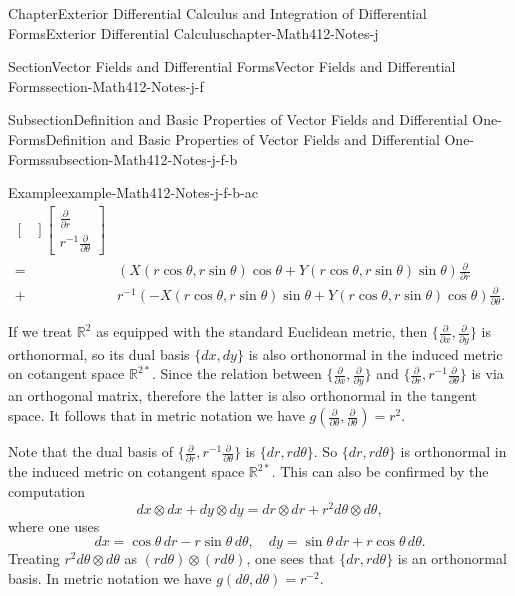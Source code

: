 \documentclass[oneside,10pt,]{book}
\numberwithin{equation}{section}
\newcommand{\bbR}{\mathbb{R}}
\newcommand{\amp}{&}
\begin{document}
\begin{chapterptx}{Chapter}{Exterior Differential Calculus and Integration of Differential Forms}{}{Exterior Differential Calculus}{}{}{chapter-Math412-Notes-j}
\begin{sectionptx}{Section}{Vector Fields and Differential Forms}{}{Vector Fields and Differential Forms}{}{}{section-Math412-Notes-j-f}
\begin{subsectionptx}{Subsection}{Definition and Basic Properties of Vector Fields and Differential One-Forms}{}{Definition and Basic Properties of Vector Fields and Differential One-Forms}{}{}{subsection-Math412-Notes-j-f-b}
\begin{example}{Example}{}{example-Math412-Notes-j-f-b-ac}
\begin{align*}
\begin{bmatrix}
\end{bmatrix}\begin{bmatrix} \frac{\partial }{\partial r} \\ r^{-1} \frac{\partial }{\partial \theta} \end{bmatrix} \\
=\amp \left( X(r\cos\theta, r\sin\theta)  \cos \theta + Y(r\cos\theta, r\sin\theta) \sin\theta\right) 
\frac{\partial }{\partial r} \\
+ \amp r^{-1}\left( -X(r\cos\theta, r\sin\theta)  \sin \theta + Y(r\cos\theta, r\sin\theta) \cos \theta\right) \frac{\partial }{\partial \theta}.
\end{align*}
%
\par
If we treat \(\bbR^{2}\) as equipped with the standard Euclidean metric, then \(\{  \frac{\partial }{\partial x},  \frac{\partial }{\partial y}\}\)  is orthonormal, so its dual basis \(\{ dx, dy\}\) is also orthonormal in the induced metric on cotangent space \(\bbR^{2*}\). Since the relation between   \(\{  \frac{\partial }{\partial x},  \frac{\partial }{\partial y}\}\) and \(\{ \frac{\partial }{\partial r} , r^{-1} \frac{\partial }{\partial \theta}\}\) is via an orthogonal matrix, therefore the latter is also orthonormal in the tangent space. It follows that  in metric notation we have \(g(\frac{\partial}{\partial \theta}, \frac{\partial}{\partial \theta})=r^{2}\).%
\par
Note that the dual basis of \(\{ \frac{\partial }{\partial r} , r^{-1} \frac{\partial }{\partial \theta}\}\) is \(\{dr, r d\theta\}\). So \(\{dr, r d\theta\}\) is orthonormal in the induced metric on cotangent space \(\bbR^{2*}\). This can also be confirmed by the computation%
\begin{equation*}
dx\otimes dx + dy \otimes dy =dr\otimes dr + r^{2}d\theta\otimes d\theta,
\end{equation*}
where one uses%
\begin{equation}
dx=\cos \theta \, dr- r\sin\theta\, d\theta, \quad
dy= \sin\theta\, dr + r\cos\theta\, d\theta\text{.}\label{men-eq-polardiff}
\end{equation}
Treating \(r^{2}d\theta\otimes d\theta\) as \((r d\theta)\otimes (r d\theta)\), one sees that \(\{dr, r d\theta\}\) is an orthonormal basis. In metric notation we have \(g(d\theta, d\theta)=r^{-2}\).%
\par

\end{example}
\end{subsectionptx}
\end{sectionptx}
\end{chapterptx}
\end{document}
